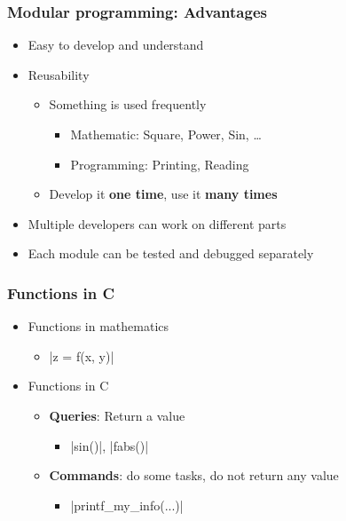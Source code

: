 \documentclass{../c-lecture}
\begin{document}
\begin{frame}
  \frametitle{Modular programming: Advantages}
  \begin{itemize}
    \item Easy to develop and understand
    \item Reusability
    \begin{itemize}
      \item Something is used frequently
      \begin{itemize}
        \item Mathematic: Square, Power, Sin, \ldots
        \item Programming: Printing, Reading
      \end{itemize}
      \item
        Develop it \textbf{\color{Orange} one time}, use it
        \textbf{\color{LimeGreen} many times}
    \end{itemize}
    \item Multiple developers can work on different parts
    \item Each module can be tested and debugged separately
  \end{itemize}
\end{frame}

\begin{frame}[fragile]
  \frametitle{Functions in C}
  \begin{itemize}
    \item Functions in mathematics
    \begin{itemize}
      \item {}|z = f(x, y)|
    \end{itemize}
    \item Functions in C
    \begin{itemize}
      \item \textbf{\color{YellowOrange} Queries}: Return a value
      \begin{itemize}
        \item {}|sin()|, |fabs()|
      \end{itemize}
      \item
        \textbf{\color{LimeGreen} Commands}: do some tasks, do not return
        any value
      \begin{itemize}
        \item {}|printf_my_info(...)|
      \end{itemize}
    \end{itemize}
  \end{itemize}
\end{frame}
\end{document}
